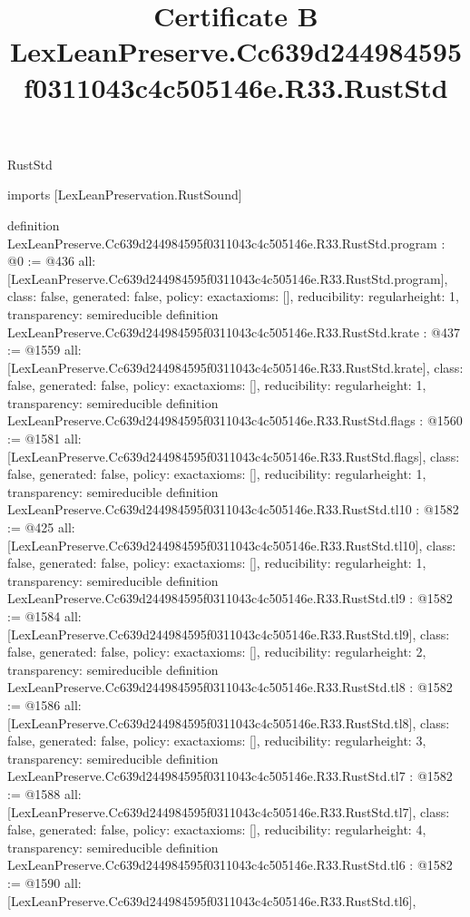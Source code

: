 \begin{lexlean}{RustStd}
\title{Certificate B LexLeanPreserve.Cc639d244984595f0311043c4c505146e.R33.RustStd}
\begin{coremodule}
imports [LexLeanPreservation.RustSound]

definition LexLeanPreserve.Cc639d244984595f0311043c4c505146e.R33.RustStd.program : @0 := @436 {
  all: [LexLeanPreserve.Cc639d244984595f0311043c4c505146e.R33.RustStd.program],
  class: false,
  generated: false,
  policy: exact{axioms: []},
  reducibility: regular{height: 1},
  transparency: semireducible
}
definition LexLeanPreserve.Cc639d244984595f0311043c4c505146e.R33.RustStd.krate : @437 := @1559 {
  all: [LexLeanPreserve.Cc639d244984595f0311043c4c505146e.R33.RustStd.krate],
  class: false,
  generated: false,
  policy: exact{axioms: []},
  reducibility: regular{height: 1},
  transparency: semireducible
}
definition LexLeanPreserve.Cc639d244984595f0311043c4c505146e.R33.RustStd.flags : @1560 := @1581 {
  all: [LexLeanPreserve.Cc639d244984595f0311043c4c505146e.R33.RustStd.flags],
  class: false,
  generated: false,
  policy: exact{axioms: []},
  reducibility: regular{height: 1},
  transparency: semireducible
}
definition LexLeanPreserve.Cc639d244984595f0311043c4c505146e.R33.RustStd.tl10 : @1582 := @425 {
  all: [LexLeanPreserve.Cc639d244984595f0311043c4c505146e.R33.RustStd.tl10],
  class: false,
  generated: false,
  policy: exact{axioms: []},
  reducibility: regular{height: 1},
  transparency: semireducible
}
definition LexLeanPreserve.Cc639d244984595f0311043c4c505146e.R33.RustStd.tl9 : @1582 := @1584 {
  all: [LexLeanPreserve.Cc639d244984595f0311043c4c505146e.R33.RustStd.tl9],
  class: false,
  generated: false,
  policy: exact{axioms: []},
  reducibility: regular{height: 2},
  transparency: semireducible
}
definition LexLeanPreserve.Cc639d244984595f0311043c4c505146e.R33.RustStd.tl8 : @1582 := @1586 {
  all: [LexLeanPreserve.Cc639d244984595f0311043c4c505146e.R33.RustStd.tl8],
  class: false,
  generated: false,
  policy: exact{axioms: []},
  reducibility: regular{height: 3},
  transparency: semireducible
}
definition LexLeanPreserve.Cc639d244984595f0311043c4c505146e.R33.RustStd.tl7 : @1582 := @1588 {
  all: [LexLeanPreserve.Cc639d244984595f0311043c4c505146e.R33.RustStd.tl7],
  class: false,
  generated: false,
  policy: exact{axioms: []},
  reducibility: regular{height: 4},
  transparency: semireducible
}
definition LexLeanPreserve.Cc639d244984595f0311043c4c505146e.R33.RustStd.tl6 : @1582 := @1590 {
  all: [LexLeanPreserve.Cc639d244984595f0311043c4c505146e.R33.RustStd.tl6],
}
\end{coremodule}
\end{lexlean}
